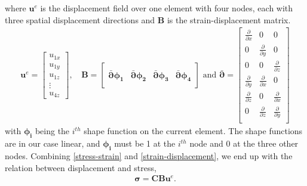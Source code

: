 where $\bm{u}^e$ is the displacement field over one element with four nodes, each with three spatial displacement directions and $\bm{B}$ is the strain-displacement matrix.
\begin{align*}
\bm{u}^e = 
\begin{bmatrix}
u_{1x} \\
u_{1y} \\
u_{1z} \\
\vdots \\
u_{4z}
\end{bmatrix}, \,
&\bm{B} = 
\begin{bmatrix} \\
\bar{\bm{\partial}} \bm{\phi_1} & \bar{\bm{\partial}} \bm{\phi_2} & \bar{\bm{\partial}} \bm{\phi_3} & \bar{\bm{\partial}} \bm{\phi_4} \\[1em]
\end{bmatrix} \textrm{ and } 
\bar{\bm{\partial}} = 
\begin{bmatrix}
\frac{\partial}{\partial x} & 0 & 0 \\[0.3em]
0 & \frac{\partial}{\partial y} & 0 \\[0.3em]
0 & 0 & \frac{\partial}{\partial z} \\[0.3em]
\frac{\partial}{\partial y} & \frac{\partial}{\partial x} & 0 \\[0.3em]
\frac{\partial}{\partial z} & 0 & \frac{\partial}{\partial x}\\[0.3em]
0 & \frac{\partial}{\partial z} & \frac{\partial}{\partial y} \\
\end{bmatrix}
\end{align*}
with $\bm{\phi_i}$ being the $i^{th}$ shape function on the current element. The shape functions are in our case linear, and $\bm{\phi_i}$ must be 1 at the $i^{th}$ node and 0 at the three other nodes. Combining \eqref{stress-strain} and \eqref{strain-displacement}, we end up with the relation between displacement and stress,
\begin{align}
\label{stress-displacement}
\bm{\sigma} = \bm{C} \bm{B} \bm{u}^e.
\end{align}











